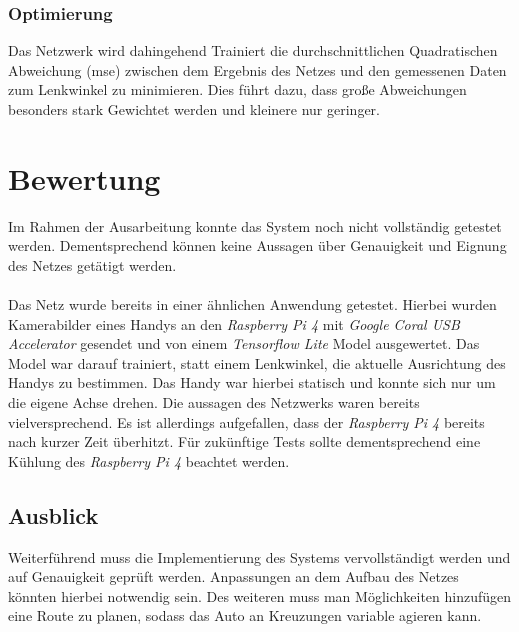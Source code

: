 \documentclass[a4paper, 12pt]{scrartcl}
\begin{document}
				\subsubsection{Optimierung}
				Das Netzwerk wird dahingehend Trainiert die durchschnittlichen Quadratischen Abweichung (mse) zwischen dem Ergebnis des Netzes und den gemessenen Daten zum Lenkwinkel zu minimieren. Dies führt dazu, dass große Abweichungen besonders stark Gewichtet werden und kleinere nur geringer. 
		
	\section{Bewertung}
	Im Rahmen der Ausarbeitung konnte das System noch nicht vollständig getestet werden. Dementsprechend können keine Aussagen über Genauigkeit und Eignung des Netzes getätigt werden. \\ \\
	Das Netz wurde bereits in einer ähnlichen Anwendung getestet. Hierbei wurden Kamerabilder eines Handys an den \emph{Raspberry Pi 4} mit \emph{Google Coral USB Accelerator} gesendet und von einem \emph{Tensorflow Lite} Model ausgewertet. Das Model war darauf trainiert, statt einem Lenkwinkel, die aktuelle Ausrichtung des Handys zu bestimmen. Das Handy war hierbei statisch und konnte sich nur um die eigene Achse drehen. Die aussagen des Netzwerks waren bereits vielversprechend. Es ist allerdings aufgefallen, dass der \emph{Raspberry Pi 4} bereits nach kurzer Zeit überhitzt. Für zukünftige Tests sollte dementsprechend eine Kühlung des \emph{Raspberry Pi 4} beachtet werden.
	
		\subsection {Ausblick}
		Weiterführend muss die Implementierung des Systems vervollständigt werden und auf Genauigkeit geprüft werden. Anpassungen an dem Aufbau des Netzes könnten hierbei notwendig sein. Des weiteren muss man Möglichkeiten hinzufügen eine Route zu planen, sodass das Auto an Kreuzungen variable agieren kann.
		
	
		
	
	
	\nocite{*}
	
\end{document}
